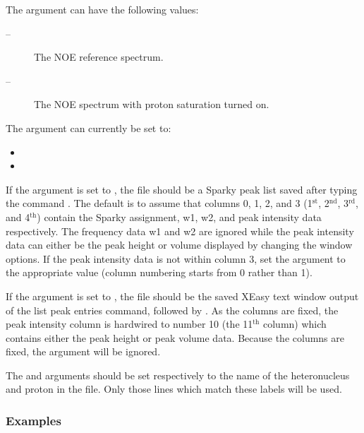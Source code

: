 The  argument can have the following values:


\begin{description}
\item[ --]  The NOE reference spectrum. 
\item[ --]  The NOE spectrum with proton saturation turned on. 
\end{description}


The  argument can currently be set to:


\begin{itemize}
\item[]  
\item[]  
\end{itemize}


If the  argument is set to , the file should be a Sparky peak list saved after typing the command .  The default is to assume that columns 0, 1, 2, and 3 (1$^\mathrm{st}$, 2$^\mathrm{nd}$, 3$^\mathrm{rd}$, and 4$^\mathrm{th}$) contain the Sparky assignment, w1, w2, and peak intensity data respectively.  The frequency data w1 and w2 are ignored while the peak intensity data can either be the peak height or volume displayed by changing the window options.  If the peak intensity data is not within column 3, set the argument  to the appropriate value (column numbering starts from 0 rather than 1).


If the  argument is set to , the file should be the saved XEasy text window output of the list peak entries command,  followed by .  As the columns are fixed, the peak intensity column is hardwired to number 10 (the 11$^\mathrm{th}$ column) which contains either the peak height or peak volume data.  Because the columns are fixed, the  argument will be ignored.


The  and  arguments should be set respectively to the name of the heteronucleus and proton in the file.  Only those lines which match these labels will be used.



\subsubsection{Examples}

